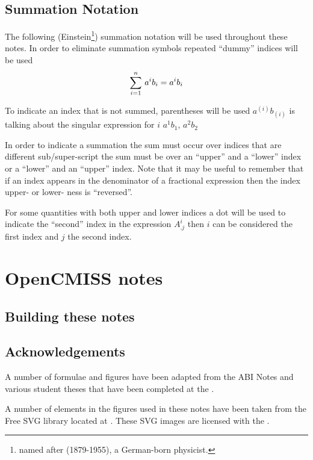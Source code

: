 \subsection{Summation Notation}
\label{subsec:IntroSummationNotation}

The following (Einstein\footnote{named after
(1879-1955), a German-born physicist.}) summation
notation will be used throughout these
notes. In order to eliminate summation symbols repeated ``dummy''
indices will be used \ie
\begin{equation}
    \displaystyle\sum_{i=1}^{n} \,a^{i}b_{i} =a^{i}b_{i}
\end{equation}

To indicate an index that is not summed, parentheses will be used
\ie $a^{(i)}b_{(i)}$ is talking about the singular expression for $i$ \eg
$a^{1}b_{1}$, $a^{2}b_{2}$ \etc

In order to indicate a summation the sum must occur over indices that are
different sub/super-script \ie the sum must be over an ``upper'' and a
``lower'' index or a ``lower'' and an ``upper'' index. Note that it may be
useful to remember that if an index appears in the denominator of a fractional
expression then the index upper- or lower- ness is ``reversed''. 

For some quantities with both upper and lower indices a dot will be used to
indicate the ``second'' index \eg in the expression $A^{i}_{.j}$ then $i$ can
be considered the first index and $j$ the second index.

\section{OpenCMISS notes} 
\label{sec:IntroOpenCMISSNotes}

\subsection{Building these notes}
\label{subsec:IntroBuildingOpenCMISSNotes}

\subsection{Acknowledgements}
\label{subsec:IntroAcknowledgements}

A number of formulae and figures have been adapted from the ABI Notes
and various student theses that have been completed at the
.

A number of elements in the figures used in these notes have been
taken from the Free {SVG} library located at
. These {SVG} images are licensed with
the .
